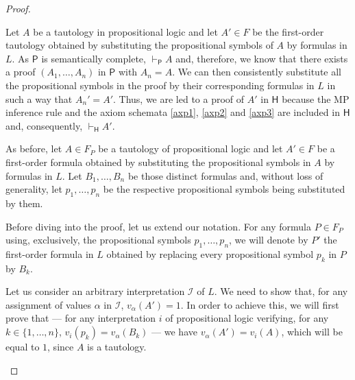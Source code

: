 \begin{proof}
\begin{parlist}
\item Let ${A}$ be a tautology in propositional logic and let $A'\in F$ be the first-order tautology obtained by substituting the propositional symbols of $A$ by formulas in $L$.
As $\mathsf{P}$ is semantically complete, $\vdash_{\mathsf{P}}{A}$ and, therefore, we know that there exists a proof $({A}_1,\ldots,{A}_n)$ in $\mathsf{P}$ with ${A}_n = {A}$.
We can then consistently substitute all the propositional symbols in the proof by their corresponding formulas in $L$ in such a way that $A_n' = A'$.
Thus, we are led to a proof of $A'$ in $\mathsf{H}$ because the MP inference rule and the axiom schemata \ref{axp1}, \ref{axp2} and \ref{axp3} are included in $\mathsf{H}$ and, consequently, $\vdash_{\mathsf{H}}{A'}$. 

\item As before, let $A \in F_P$ be a tautology of propositional logic and let $A' \in F$ be a first-order formula obtained by substituting the propositional symbols in $A$ by formulas in $L$.
Let $B_1,\ldots,B_n$ be those distinct formulas and, without loss of generality, let $p_1,\ldots,p_n$ be the respective propositional symbols being substituted by them.

Before diving into the proof, let us extend our notation. For any formula $P\in F_P$ using, exclusively, the propositional symbols $p_1,\ldots,p_n$, we will denote by $P'$ the first-order formula in $L$ obtained by replacing every propositional symbol $p_k$ in $P$ by $B_k$.

Let us consider an arbitrary interpretation $\mathcal{I}$ of $L$. We need to show that, for any assignment of values $\alpha$ in $\mathcal{I}$, $v_\alpha(A') = 1$. In order to achieve this, we will first prove that --- for any interpretation $i$ of propositional logic verifying, for any $k \in \{1,\ldots,n\}$, $v_i(p_k) = v_\alpha(B_k)$ --- we have $v_\alpha(A') = v_i(A)$, which will be equal to $1$, since $A$ is a tautology.


\end{parlist}
\end{proof}
